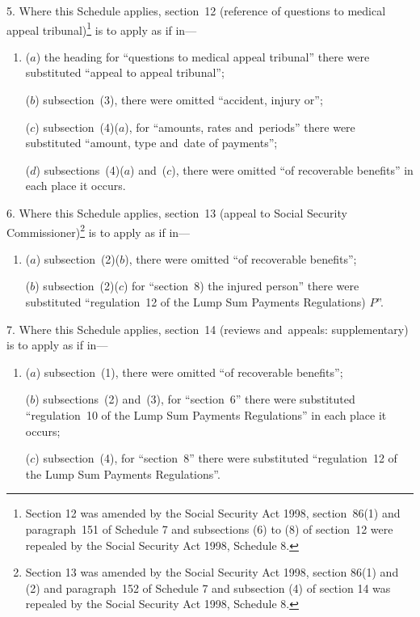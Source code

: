 \documentclass[12pt,a4paper]{article}
\begin{document}
5.  Where this Schedule applies, section~12 (reference of questions to medical appeal tribunal)\footnote{Section 12 was amended by the Social Security Act 1998, section~86(1) and paragraph~151 of Schedule 7 and subsections (6) to (8) of section~12 were repealed by the Social Security Act 1998, Schedule 8.} is to apply as if in—
\begin{enumerate}\item[]
($a$) the heading for “questions to medical appeal tribunal” there were substituted “appeal to appeal tribunal”;

($b$) subsection~(3), there were omitted “accident, injury or”;

($c$) subsection~(4)($a$), for “amounts, rates and~periods” there were substituted “amount, type and~date of payments”;

($d$) subsections~(4)($a$)  and~($c$), there were omitted “of recoverable benefits” in each place it occurs.
\end{enumerate}

\medskip

6.  Where this Schedule applies, section~13 (appeal to Social Security Commissioner)\footnote{Section 13 was amended by the Social Security Act 1998, section 86(1) and (2) and paragraph~152 of Schedule 7 and subsection (4) of section 14 was repealed by the Social Security Act 1998, Schedule 8.} is to apply as if in—
\begin{enumerate}\item[]
($a$) subsection~(2)($b$), there were omitted “of recoverable benefits”;

($b$) subsection~(2)($c$)  for “section~8) the injured person” there were substituted “regulation~12 of the Lump Sum Payments Regulations) $P$”.
\end{enumerate}

\medskip

7.  Where this Schedule applies, section~14 (reviews and~appeals: supplementary) is to apply as if in—
\begin{enumerate}\item[]
($a$) subsection~(1), there were omitted “of recoverable benefits”;

($b$) subsections~(2) and~(3), for “section~6” there were substituted “regulation~10 of the Lump Sum Payments Regulations” in each place it occurs;

($c$) subsection~(4), for “section~8” there were substituted “regulation~12 of the Lump Sum Payments Regulations”.
\end{enumerate}
\end{document}
